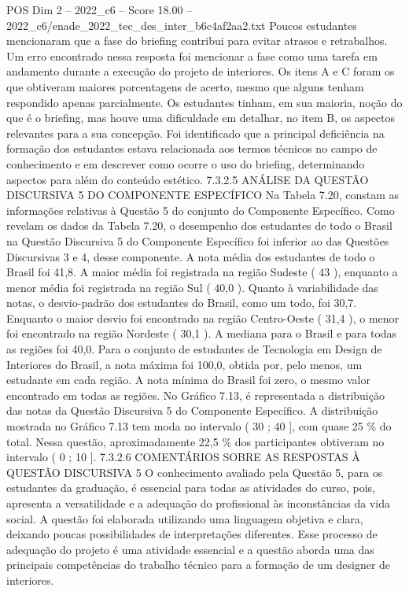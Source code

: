 \begin{textsample}{POS Dim 2 – 2022\_c6 – Score 18.00 – 2022\_c6/enade\_2022\_tec\_des\_inter\_b6c4af2aa2.txt}
Poucos estudantes mencionaram que a fase do briefing contribui para evitar atrasos e retrabalhos.
Um erro encontrado nessa resposta foi mencionar a fase como uma tarefa em andamento durante a execução do projeto de interiores.
Os itens A e C foram os que obtiveram maiores porcentagens de acerto, mesmo que alguns tenham respondido apenas parcialmente.
Os estudantes tinham, em sua maioria, noção do que é o briefing, mas houve uma dificuldade em detalhar, no item B, os aspectos relevantes para a sua concepção.
Foi identificado que a principal deficiência na formação dos estudantes estava relacionada aos termos técnicos no campo de conhecimento e em descrever como ocorre o uso do briefing, determinando aspectos para além do conteúdo estético. 7.3.2.5 ANÁLISE DA QUESTÃO DISCURSIVA 5 DO COMPONENTE ESPECÍFICO Na Tabela 7.20, constam as informações relativas à Questão 5 do conjunto do Componente Específico.
Como revelam os dados da Tabela 7.20, o desempenho dos estudantes de todo o Brasil na Questão Discursiva 5 do Componente Específico foi inferior ao das Questões Discursivas 3 e 4, desse componente.
A nota média dos estudantes de todo o Brasil foi 41,8.
A maior média foi registrada na região Sudeste ( 43 ), enquanto a menor média foi registrada na região Sul ( 40,0 ).
Quanto à variabilidade das notas, o desvio-padrão dos estudantes do Brasil, como um todo, foi 30,7.
Enquanto o maior desvio foi encontrado na região Centro-Oeste ( 31,4 ), o menor foi encontrado na região Nordeste ( 30,1 ).
A mediana para o Brasil e para todas as regiões foi 40,0.
Para o conjunto de estudantes de Tecnologia em Design de Interiores do Brasil, a nota máxima foi 100,0, obtida por, pelo menos, um estudante em cada região.
A nota mínima do Brasil foi zero, o mesmo valor encontrado em todas as regiões.
No Gráfico 7.13, é representada a distribuição das notas da Questão Discursiva 5 do Componente Específico.
A distribuição mostrada no Gráfico 7.13 tem moda no intervalo ( 30 ; 40 ], com quase 25 \% do total.
Nessa questão, aproximadamente 22,5 \% dos participantes obtiveram no intervalo ( 0 ; 10 ]. 7.3.2.6 COMENTÁRIOS SOBRE AS RESPOSTAS À QUESTÃO DISCURSIVA 5 O conhecimento avaliado pela Questão 5, para os estudantes da graduação, é essencial para todas as atividades do curso, pois, apresenta a versatilidade e a adequação do profissional às inconstâncias da vida social.
A questão foi elaborada utilizando uma linguagem objetiva e clara, deixando poucas possibilidades de interpretações diferentes.
Esse processo de adequação do projeto é uma atividade essencial e a questão aborda uma das principais competências do trabalho técnico para a formação de um designer de interiores.

\end{textsample}

